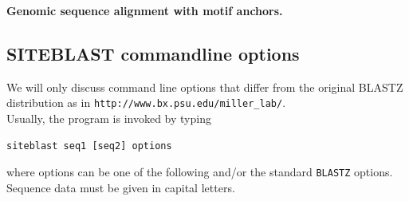 \documentclass{article}
\begin{document}
{\large {\bfseries Genomic sequence alignment with motif anchors.}}
\begin{abstract}
{\large Motivation:} Comparative sequence analysis is the essence of many approaches to genome annotation. Heuristic alignment algorithms utilize similar seed pairs to anchor an alignment. Some applications of local alignment algorithms (e.g. phylogenetic footprinting) would benefit from including prior knowledge (e.g. binding site motifs) in the alignment building process.
\\
{\large Results:} We introduce predefined sequence patterns as anchor points into a heuristic local alignment strategy. We extended the BLASTZ program for this purpose. A set of seed patterns is either given as consensus sequences in IUPAC code or position-weight-matrices (PWMs). Phylogenetic footprinting of promoter regions is one of many potential application for the SITEBLAST software.
\end{abstract}
\subsection*{SITEBLAST commandline options}
We will only discuss command line options that differ from the original BLASTZ distribution as in {\tt http://www.bx.psu.edu/miller\_lab/}.
\\
Usually, the program is invoked by typing
\begin{verbatim}
siteblast seq1 [seq2] options
\end{verbatim}
where options can be one of the following and/or the standard {\tt BLASTZ} options. Sequence data must be given in capital letters.
\end{document}
